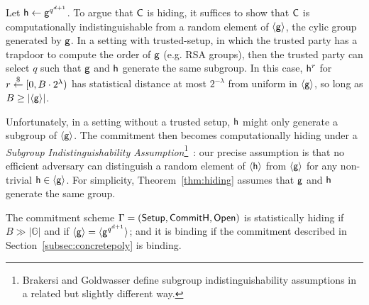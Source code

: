 Let $\mathsf{h} \leftarrow \mathsf{g}^{q^{d+1}}$. 
To argue that $\mathsf{C}$ is hiding, it suffices to show that $\mathsf{C}$ is computationally indistinguishable from a random element of $\langle \mathsf{g}\rangle$, the cylic group generated by $\mathsf{g}$. In a setting with trusted-setup, in which the trusted party has a trapdoor to compute the order of $\mathsf{g}$ (e.g. RSA groups), then the trusted party can select $q$ such that $\mathsf{g}$ and $\mathsf{h}$ generate the same subgroup. In this case, $\mathsf{h}^r$ for $r \overset{\$}{\gets} [0, B\cdot 2^\lambda)$ has statistical distance at most $2^{-\lambda}$ from uniform in $\langle \mathsf{g} \rangle$, so long as $B \geq |\langle \mathsf{g} \rangle|$. 


Unfortunately, in a setting without a trusted setup, $\mathsf{h}$ might only generate a subgroup of $\langle \mathsf{g} \rangle$. The commitment then becomes computationally hiding under a \emph{Subgroup Indistinguishability Assumption}\footnote{Brakersi and Goldwasser define subgroup indistinguishability assumptions in a related but slightly different way.}~\cite{C:BraGol10}: our precise assumption is that no efficient adversary can distinguish a random element of $\langle \mathsf{h} \rangle$ from $\langle \mathsf{g} \rangle$ for any non-trivial $\mathsf{h} \in \langle \mathsf{g} \rangle$. %
For simplicity, Theorem~\ref{thm:hiding} assumes that $\mathsf{g}$ and $\mathsf{h}$ generate the same group.

\begin{theorem}\label{thm:hiding}
The commitment scheme $\Gamma = (\textsf{{Setup}}, \textsf{{CommitH}}, \textsf{{Open}})$ is statistically hiding if $B \gg |\mathbb{G}|$ and if $\langle \mathsf{g} \rangle = \langle \mathsf{g}^{q^{d+1}} \rangle$; and it is binding if the commitment described in Section~\ref{subsec:concretepoly} is binding.
\end{theorem}

